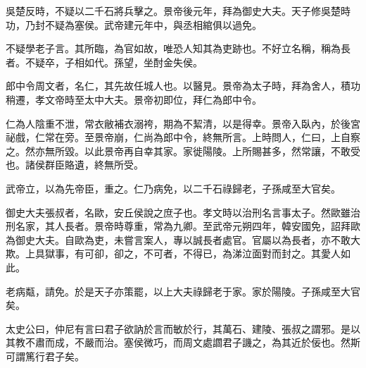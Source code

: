 吳楚反時，不疑以二千石將兵擊之。景帝後元年，拜為御史大夫。天子修吳楚時功，乃封不疑為塞侯。武帝建元年中，與丞相綰俱以過免。

不疑學老子言。其所臨，為官如故，唯恐人知其為吏跡也。不好立名稱，稱為長者。不疑卒，子相如代。孫望，坐酎金失侯。

郎中令周文者，名仁，其先故任城人也。以醫見。景帝為太子時，拜為舍人，積功稍遷，孝文帝時至太中大夫。景帝初即位，拜仁為郎中令。

仁為人陰重不泄，常衣敝補衣溺袴，期為不絜清，以是得幸。景帝入臥內，於後宮祕戲，仁常在旁。至景帝崩，仁尚為郎中令，終無所言。上時問人，仁曰，上自察之。然亦無所毀。以此景帝再自幸其家。家徙陽陵。上所賜甚多，然常讓，不敢受也。諸侯群臣賂遺，終無所受。

武帝立，以為先帝臣，重之。仁乃病免，以二千石祿歸老，子孫咸至大官矣。

御史大夫張叔者，名歐，安丘侯說之庶子也。孝文時以治刑名言事太子。然歐雖治刑名家，其人長者。景帝時尊重，常為九卿。至武帝元朔四年，韓安國免，詔拜歐為御史大夫。自歐為吏，未嘗言案人，專以誠長者處官。官屬以為長者，亦不敢大欺。上具獄事，有可卻，卻之，不可者，不得已，為涕泣面對而封之。其愛人如此。

老病甐，請免。於是天子亦策罷，以上大夫祿歸老于家。家於陽陵。子孫咸至大官矣。

太史公曰，仲尼有言曰君子欲訥於言而敏於行，其萬石、建陵、張叔之謂邪。是以其教不肅而成，不嚴而治。塞侯微巧，而周文處讇君子譏之，為其近於佞也。然斯可謂篤行君子矣。